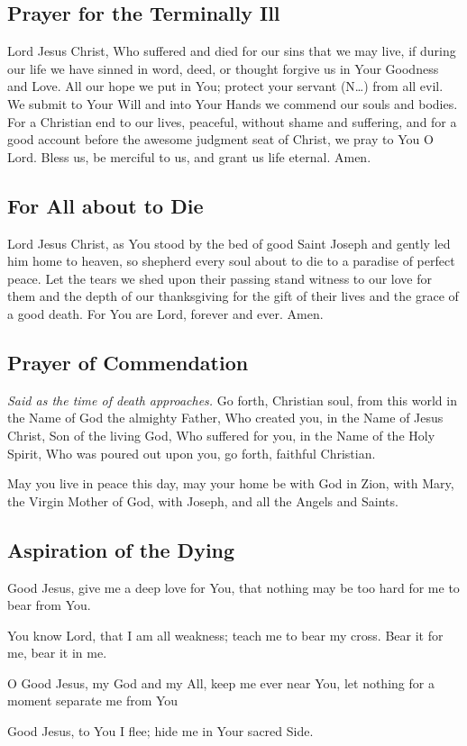 \documentclass[12pt]{article}
\newcommand{\prayertitle}[1]{\subsection{#1}}
\newcommand{\insertname}{(N\dots)\xspace}
\newcommand{\emphasis}[1]{\emph{#1}}
\newcommand{\emphasis}[1]{\textsl{#1}}
\newcommand{\note}[1]{{\small{\emphasis{#1}}}\newline}
\begin{document}
\prayertitle{Prayer for the Terminally Ill}
Lord Jesus Christ, Who suffered and died for our sins that we may live, if during our life we have sinned in word, deed, or thought forgive us in Your Goodness and Love.
All our hope we put in You;
protect your servant \insertname from all evil.
We submit to Your Will and into Your Hands we commend our souls and bodies.
For a Christian end to our lives, peaceful, without shame and suffering, and for a good account before the awesome judgment seat of Christ, we pray to You O Lord.
Bless us, be merciful to us, and grant us life eternal.
Amen.

\prayertitle{For All about to Die}
Lord Jesus Christ, as You stood by the bed of good Saint Joseph and gently led him home to heaven, so shepherd every soul about to die to a paradise of perfect peace.
Let the tears we shed upon their passing stand witness to our love for them and the depth of our thanksgiving for the gift of their lives and the grace of a good death.
For You are Lord, forever and ever.
Amen.

\prayertitle{Prayer of Commendation}
\note{Said as the time of death approaches.}
Go forth, Christian soul, from this world in the Name of God the almighty Father, Who created you, in the Name of Jesus Christ, Son of the living God, Who suffered for you, in the Name of the Holy Spirit, Who was poured out upon you, go forth, faithful Christian.

May you live in peace this day, may your home be with God in Zion, with Mary, the Virgin Mother of God, with Joseph, and all the Angels and Saints.

\prayertitle{Aspiration of the Dying}
Good Jesus, give me a deep love for You, that nothing may be too hard for me to bear from You.

You know Lord, that I am all weakness; teach me to bear my cross.
Bear it for me, bear it in me.

O Good Jesus, my God and my All, keep me ever near You, let nothing for a moment separate me from You

Good Jesus, to You I flee;
hide me in Your sacred Side.
\end{document}
